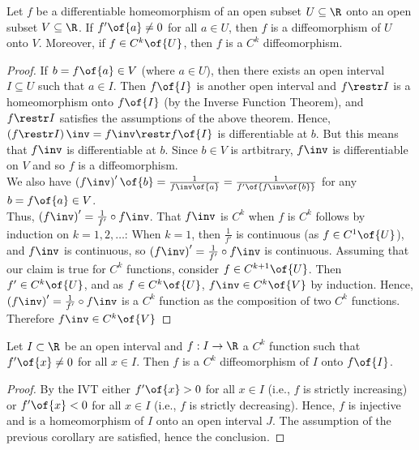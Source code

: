\begin{corollary}
    Let $f$ be a differentiable homeomorphism of an open subset $U \subseteq \R$ onto an open subset $V \subseteq \R$. If $f'\of{a} \neq 0$ for all $a \in U$, then $f$ is a diffeomorphism of $U$ onto $V$. Moreover, if $f \in C^k\of{U}$, then $f$ is a $C^k$ diffeomorphism.
\end{corollary}
\begin{proof}
    If $b = f\of{a} \in V$ (where $a \in U$), then there exists an open interval $I \subseteq U$ such that $a \in I$. Then $f\of{I}$ is another open interval and $f \restr I$ is a homeomorphism onto $f\of{I}$ (by the Inverse Function Theorem), and $f \restr I$ satisfies the assumptions of the above theorem. Hence, $\left(f \restr I\right)\inv = f\inv \restr f\of{I}$ is differentiable at $b$. But this means that $f\inv$ is differentiable at $b$. Since $b \in V$ is artbitrary, $f\inv$ is differentiable on $V$ and so $f$ is a diffeomorphism. \\
    We also have $\left(f\inv\right)'\of{b} = \frac{1}{f\inv\of{a}} = \frac{1}{f'\of{f\inv\of{b}}}$ for any $b = f\of{a} \in V$. \\
    Thus, $\left(f\inv\right)' = \frac{1}{f'} \circ f\inv$. That $f\inv$ is $C^k$ when $f$ is $C^k$ follows by induction on $k = 1, 2, \dots$: When $k = 1$, then $\frac{1}{f'}$ is continuous (as $f \in C^1\of{U}$), and $f\inv$ is continuous, so $\left(f\inv\right)' = \frac{1}{f'} \circ f\inv$ is continuous. Assuming that our claim is true for $C^k$ functions, consider $f \in C^{k+1}\of{U}$. Then $f' \in C^k\of{U}$, and as $f \in C^k\of{U}$, $f\inv \in C^k\of{V}$ by induction. Hence, $\left(f\inv\right)' = \frac{1}{f'} \circ f\inv$ is a $C^k$ function as the composition of two $C^k$ functions. Therefore $f\inv \in C^{k}\of{V}$ 
\end{proof}

\begin{corollary}
    Let $I \subset \R$ be an open interval and $f: I \to \R$ a $C^k$ function such that $f'\of{x} \neq 0$ for all $x \in I$. Then $f$ is a $C^k$ diffeomorphism of $I$ onto $f\of{I}$.
\end{corollary}
\begin{proof}
    By the IVT either $f'\of{x} > 0$ for all $x \in I$ (i.e., $f$ is strictly increasing) or $f'\of{x} < 0$ for all $x \in I$ (i.e., $f$ is strictly decreasing). Hence, $f$ is injective and is a homeomorphism of $I$ onto an open interval $J$. The assumption of the previous corollary are satisfied, hence the conclusion.
\end{proof}

